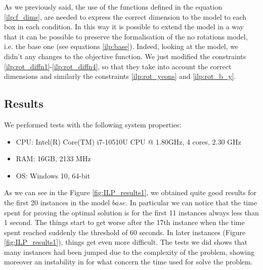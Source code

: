     As we previously said, the use of the functions defined in the equation \ref{ilp:f_dims}, are 
    needed to express the correct dimension to the model to each box in each condition. In this way 
    it is possible to extend the model in a way that it can be possible to preserve the 
    formalisation of the no rotations model, i.e. the base one (see equations \ref{ilp:base}).
    Indeed, looking at the model, we didn't any changes to the objective function. We just modified
    the constraints \ref{ilp:rot_diffn1}-\ref{ilp:rot_diffn4}, so that they take into account the 
    correct dimensions and similarly the constraints \ref{ilp:rot_ycons} and \ref{ilp:rot_b_y}.



\subsection{Results}
    We performed tests with the following system properties:
    \begin{itemize}
        \item CPU: Intel(R) Core(TM) i7-10510U CPU @ 1.80GHz, 4 cores, 2.30 GHz
        \item RAM: 16GB, 2133 MHz
        \item OS: Windows 10, 64-bit
    \end{itemize}

    As we can see in the Figure \ref{fig:ILP_results1}, we obtained quite good results for the 
    first 20 instances in the model \(base\). In particular we can notice that the time spent for
    proving the optimal solution is for the first 11 instances always less than 1 second. The 
    things start to get worse after the 17th instance when the time spent reached suddenly the
    threshold of 60 seconds. In later instances (Figure \ref{fig:ILP_results1}), things get even 
    more difficult. The tests we did shows that many instances had been jumped due to the 
    complexity of the problem, showing moreover an instability in for what concern the time used 
    for solve the problem. \\
    
